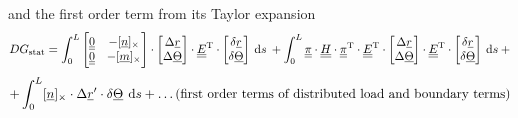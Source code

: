 \begin{frame}
  \vspace{0.7em}
  and the first order term from its Taylor expansion
  \begin{displaymath}
    DG_{\text{stat}} =
    \int_0^L
      \begin{bmatrix}
        \doubleunderline{0} & - [ \underline{n} ]_{\times} \\
        \doubleunderline{0} & - [ \underline{m} ]_{\times}
      \end{bmatrix} \cdot
      \begin{bmatrix}
        \Delta \underline{r} \\
        \Delta \underline{\Theta}
      \end{bmatrix} \cdot
      \doubleunderline{E}^{\mathrm{T}} \cdot
      \begin{bmatrix}
        \delta \underline{r} \\ \delta \underline{\Theta}
      \end{bmatrix}
    \: \dif s \:
    + \int_0^L
      \doubleunderline{\pi} \cdot
      \doubleunderline{H} \cdot
      \doubleunderline{\pi}^{\mathrm{T}} \cdot
      \doubleunderline{E}^{\mathrm{T}} \cdot
      \begin{bmatrix}
        \Delta \underline{r} \\
        \Delta \underline{\Theta}
      \end{bmatrix} \cdot
      \doubleunderline{E}^{\mathrm{T}} \cdot
      \begin{bmatrix}
        \delta \underline{r} \\ \delta \underline{\Theta}
      \end{bmatrix}
    \: \dif s \: +
  \end{displaymath}
  \begin{displaymath}
   + \int_0^L
      [ \underline{n} ]_{\times} \cdot \Delta \underline{r}^{\prime} \cdot \delta \underline{\Theta}
    \: \dif s
   + \dots (\text{first order terms of distributed load and boundary terms})
  \end{displaymath}
  
\end{frame}


